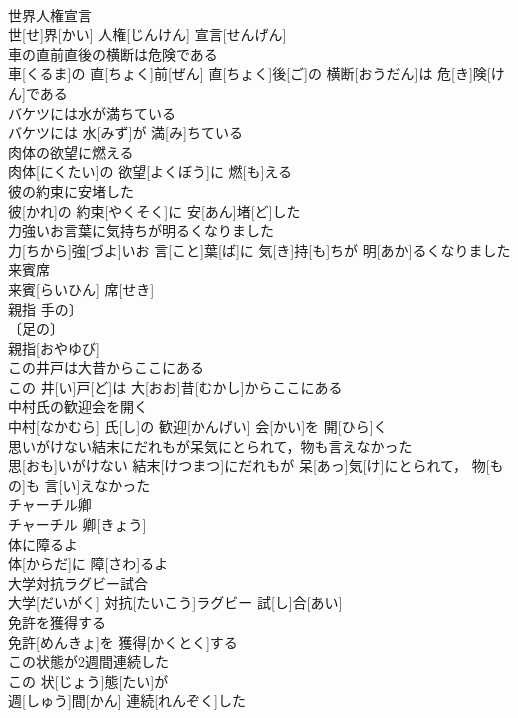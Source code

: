 \documentclass[8pt]{extreport}
\begin{document}
\begin{CJK}{UTF8}{min}
\\	世界人権宣言	
\\	世[せ]界[かい] 人権[じんけん] 宣言[せんげん]
\\	車の直前直後の横断は危険である	
\\	車[くるま]の 直[ちょく]前[ぜん] 直[ちょく]後[ご]の 横断[おうだん]は 危[き]険[けん]である
\\	バケツには水が満ちている	
\\	バケツには 水[みず]が 満[み]ちている
\\	肉体の欲望に燃える	
\\	肉体[にくたい]の 欲望[よくぼう]に 燃[も]える
\\	彼の約束に安堵した	
\\	彼[かれ]の 約束[やくそく]に 安[あん]堵[ど]した
\\	力強いお言葉に気持ちが明るくなりました	
\\	力[ちから]強[づよ]いお 言[こと]葉[ば]に 気[き]持[も]ちが 明[あか]るくなりました
\\	来賓席	
\\	来賓[らいひん] 席[せき]
\\	親指	手の〕
\\	〔足の〕
\\	親指[おやゆび]
\\	この井戸は大昔からここにある	
\\	この 井[い]戸[ど]は 大[おお]昔[むかし]からここにある
\\	中村氏の歓迎会を開く	
\\	中村[なかむら] 氏[し]の 歓迎[かんげい] 会[かい]を 開[ひら]く
\\	思いがけない結末にだれもが呆気にとられて，物も言えなかった	
\\	思[おも]いがけない 結末[けつまつ]にだれもが 呆[あっ]気[け]にとられて， 物[もの]も 言[い]えなかった
\\	チャーチル卿	
\\	チャーチル 卿[きょう]
\\	体に障るよ	
\\	体[からだ]に 障[さわ]るよ
\\	大学対抗ラグビー試合	
\\	大学[だいがく] 対抗[たいこう]ラグビー 試[し]合[あい]
\\	免許を獲得する	
\\	免許[めんきょ]を 獲得[かくとく]する
\\	この状態が2週間連続した	
\\	この 状[じょう]態[たい]が 
\\	週[しゅう]間[かん] 連続[れんぞく]した

\end{CJK}
\end{document}
